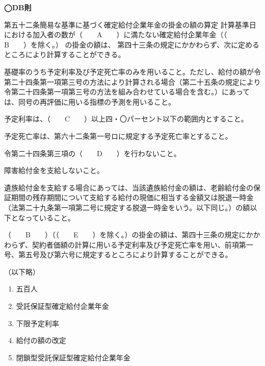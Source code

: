 \begin{fillblank}[年金1 H27 問題1(3)]
  \noindent \textbf{◯DB則}
  \begin{lawstructure}
    \begin{lawarticle}{第五十二条}{簡易な基準に基づく確定給付企業年金の掛金の額の算定}
      計算基準日における加入者の数が（　　A　　）に満たない確定給付企業年金（（　　B　　）を除く。）
      の掛金の額は、
      第四十三条の規定にかかわらず、次に定めるところにより計算することができる。

      基礎率のうち予定利率及び予定死亡率のみを用いること。ただし、給付の額が令第二十四条第一項第三号の方法により計算される場合（第二十五条の規定により令第二十四条第一項第三号の方法を組み合わせている場合を含む。）にあっては、同号の再評価に用いる指標の予測を用いること。

      予定利率は、（　　C　　）以上四・〇パーセント以下の範囲内とすること。

      予定死亡率は、第六十二条第一号ロに規定する予定死亡率とすること。

      令第二十四条第三項の（　　D　　）を行わないこと。

      障害給付金を支給しないこと。

      遺族給付金を支給する場合にあっては、当該遺族給付金の額は、老齢給付金の保証期間の残存期間について支給する給付の現価に相当する金額又は脱退一時金（法第二十九条第一項第二号に規定する脱退一時金をいう。以下同じ。）の額以下となっていること。

      （　　B　　）（（　　E　　）を除く。）の掛金の額は、第四十三条の規定にかかわらず、契約者価額の計算に用いる予定利率及び予定死亡率を用い、前項第一号、第五号及び第六号に規定するところにより計算することができる。
    
      （以下略）
    \end{lawarticle}
  \end{lawstructure}
\end{fillblank}

\begin{answerbox}
  \begin{enumerate}[A: ]
    \item 五百人
    \item 受託保証型確定給付企業年金
    \item 下限予定利率
    \item 給付の額の改定
    \item 閉鎖型受託保証型確定給付企業年金
  \end{enumerate}
\end{answerbox}

